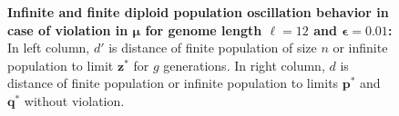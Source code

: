 \begin{figure}[h]
\begin{center}
\hspace{-3em}%
\vspace{-0.5em}  \hspace{-3em}%


\caption{\textbf{Infinite and finite diploid population oscillation behavior in case of violation in $\bm{\mu}$ for genome length $\ell = 12$ and $\bm{\epsilon} = 0.01$:} 
  In left column, $d'$ is distance of finite population of size $n$ or infinite population to limit $\bm{z}^\ast$ for $g$ generations. In right column, $d$ is distance of finite population or infinite population to limits $\bm{p}^\ast$ and $\bm{q}^\ast$ without violation.}
\label{oscillation_12d_vio_mu_0.01}
\end{center}
\end{figure}

